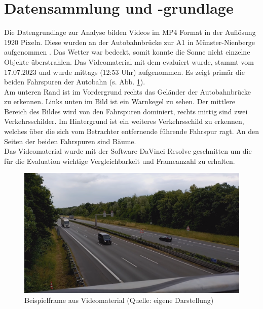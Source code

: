 \section{Datensammlung und -grundlage}
{ \label{sec:datengrundlage}
	Die Datengrundlage zur Analyse bilden Videos im MP4 Format in der Auflösung 1920  Pixeln. Diese wurden an der Autobahnbrücke zur A1 in Münster-Nienberge aufgenommen \citep{GMaps}. Das Wetter war bedeckt, somit konnte die Sonne nicht einzelne Objekte überstrahlen. Das Videomaterial mit dem evaluiert wurde, stammt vom 17.07.2023 und wurde mittags (12:53 Uhr) aufgenommen. Es zeigt primär die beiden Fahrspuren der Autobahn (s. Abb. \ref{Bsp_Evaluations_Vidmat}). \\
	Am unteren Rand ist im Vordergrund rechts das Geländer der Autobahnbrücke zu erkennen. Links unten im Bild ist ein Warnkegel zu sehen. Der mittlere Bereich des Bildes wird von den Fahrspuren dominiert, rechts mittig sind zwei Verkehrsschilder. Im Hintergrund ist ein weiteres Verkehrsschild zu erkennen, welches über die sich vom Betrachter entfernende führende Fahrspur ragt. An den Seiten der beiden Fahrspuren sind Bäume. \\
	Das Videomaterial wurde mit der Software DaVinci Resolve \citep{davinciresolve} geschnitten um die für die Evaluation wichtige Vergleichbarkeit und Frameanzahl zu erhalten.
	\begin{figure}[ht]
		\centering
		\includegraphics*[scale = 0.25, keepaspectratio ]{images/Evaluation/Screenshot_Video_A10s.png}
		\caption[Beispielframe aus Videomaterial]{Beispielframe aus Videomaterial (Quelle: eigene Darstellung)} 
		\label{Bsp_Evaluations_Vidmat}
 \end{figure}
}



